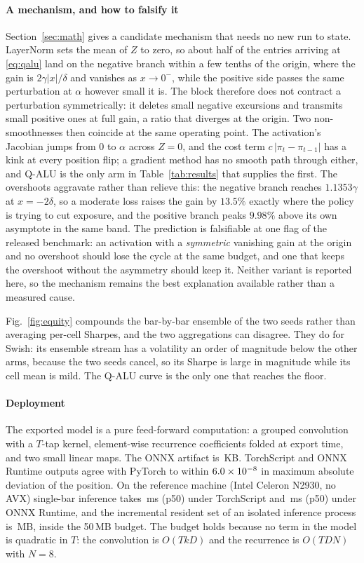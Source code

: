 \documentclass[conference]{IEEEtran}
\begin{document}
\paragraph{A mechanism, and how to falsify it}
Section~\ref{sec:math} gives a candidate mechanism that needs no new run to
state. LayerNorm sets the mean of $Z$ to zero, so about half of the entries
arriving at \eqref{eq:qalu} land on the negative branch within a few tenths of
the origin, where the gain is $2\gamma|x|/\delta$ and vanishes as $x\to0^-$,
while the positive side passes the same perturbation at $\alpha$ however small
it is. The block therefore does not contract a perturbation symmetrically: it
deletes small negative excursions and transmits small positive ones at full
gain, a ratio that diverges at the origin. Two non-smoothnesses then coincide at
the same operating point. The activation's Jacobian jumps from $0$ to $\alpha$
across $Z=0$, and the cost term $c\,|\pi_t-\pi_{t-1}|$ has a kink at every
position flip; a gradient method has no smooth path through either, and Q-ALU is
the only arm in Table~\ref{tab:results} that supplies the first. The overshoots
aggravate rather than relieve this: the negative branch reaches
$1.1353\gamma$ at $x=-2\delta$, so a moderate loss raises the gain by $13.5\%$
exactly where the policy is trying to cut exposure, and the positive branch
peaks $9.98\%$ above its own asymptote in the same band. The prediction is
falsifiable at one flag of the released benchmark: an activation with a
\emph{symmetric} vanishing gain at the origin and no overshoot should lose the
cycle at the same budget, and one that keeps the overshoot without the
asymmetry should keep it. Neither variant is reported here, so the mechanism
remains the best explanation available rather than a measured cause.

Fig.~\ref{fig:equity} compounds the bar-by-bar ensemble of the two seeds rather
than averaging per-cell Sharpes, and the two aggregations can disagree. They do
for Swish: its ensemble stream has a volatility an order of magnitude below the
other arms, because the two seeds cancel, so its Sharpe is large in magnitude
while its cell mean is mild. The Q-ALU curve is the only one that reaches the
floor.

\paragraph{Deployment}
The exported model is a pure feed-forward computation: a grouped convolution
with a $T$-tap kernel, element-wise recurrence coefficients folded at export
time, and two small linear maps. The ONNX artifact is \onnxKb\,KB. TorchScript
and ONNX Runtime outputs agree with PyTorch to within $6.0\times10^{-8}$ in maximum
absolute deviation of the position. On the reference machine (Intel Celeron N2930, no AVX)
single-bar inference takes \latencyTorch\,ms (p50) under TorchScript and
\latencyOnnx\,ms (p50) under ONNX Runtime, and the incremental resident set of an
isolated inference process is \rssOnnx\,MB, inside the 50\,MB budget. The budget
holds because no term in the model is quadratic in $T$: the convolution is
$O(T k D)$ and the recurrence is $O(T D N)$ with $N=8$.
\end{document}
